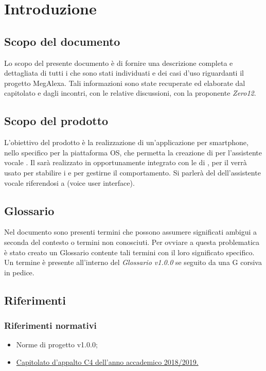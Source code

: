 \clearpage
\section{Introduzione}
\subsection{Scopo del documento}
Lo scopo del presente documento è di fornire una descrizione completa e dettagliata di tutti i  che sono stati individuati e dei casi d'uso riguardanti il progetto MegAlexa.
Tali informazioni sono state recuperate ed elaborate dal capitolato e dagli incontri, con le relative discussioni, con la proponente \emph{Zero12}.
\subsection{Scopo del prodotto}
L'obiettivo del prodotto è la realizzazione di un'applicazione per smartphone, nello specifico per la piattaforma  OS, che permetta la creazione di  per l'assistente vocale  . Il  sarà realizzato in  opportunamente integrato con le  di , per il  verrà usato  per stabilire i  e  per gestirne il comportamento. Si parlerà del  dell'assistente vocale riferendosi a  (voice user interface).
\subsection{Glossario}
Nel documento sono presenti termini che possono assumere significati ambigui a seconda del contesto o termini non conosciuti. Per ovviare a questa problematica è stato creato un Glossario contente tali termini con il loro significato specifico. Un termine è presente all'interno del \emph{Glossario v1.0.0} se seguito da una G corsiva in pedice.
\subsection{Riferimenti}
\subsubsection{Riferimenti normativi}
\begin{itemize}
	\item Norme di progetto v1.0.0;
	\item \href{https://www.math.unipd.it/~tullio/IS-1/2018/Progetto/C4.pdf} {Capitolato d’appalto C4 dell'anno accademico 2018/2019.}
\end{itemize}
